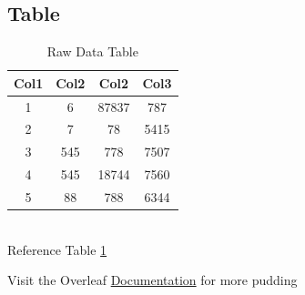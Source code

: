 \documentclass[8pt, letterpaper]{article}
\begin{document}
\begin{center}
    \item \section{Table}
\end{center}

\begin{table}[h!]
\centering
 \begin{tabular}{||c c c c||} 
 \hline
 Col1 & Col2 & Col2 & Col3 \\ [0.5ex] 
 \hline\hline
 1 & 6 & 87837 & 787 \\ 
 \hline
 2 & 7 & 78 & 5415 \\
 \hline
 3 & 545 & 778 & 7507 \\
 \hline
 4 & 545 & 18744 & 7560 \\
 \hline
 5 & 88 & 788 & 6344 \\ [1ex] 
 \hline
\end{tabular}
\caption{Raw Data Table}
\label{tab:rawdata}
\end{table} \leavevmode \\

Reference Table \ref{tab:rawdata}

Visit the Overleaf \hspace{1em} \href{https://www.overleaf.com/learn/latex/Learn_LaTeX_in_30_minutes}{Documentation} \hspace{1em} for more pudding
\end{document}
